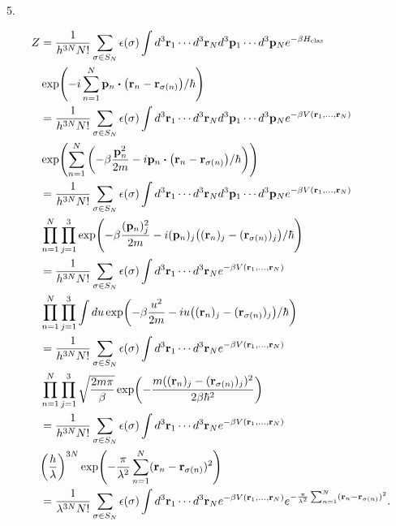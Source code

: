 \documentclass{article}
\begin{document}
5. 

\begin{align}
\begin{split}
Z&=\frac{1}{h^{3N}N!}\sum_{\sigma\in S_N}\epsilon(\sigma)\int d^3\vb{r}_1\cdots d^3\vb{r}_N d^3\vb{p}_1\cdots d^3\vb{p}_Ne^{-\beta H_{\text{clas}}}\\
&\exp(-i\sum_{n=1}^N\vb{p}_n\vdot\qty(\vb{r}_n-\vb{r}_{\sigma(n)})/\hbar)\\
&=\frac{1}{h^{3N}N!}\sum_{\sigma\in S_N}\epsilon(\sigma)\int d^3\vb{r}_1\cdots d^3\vb{r}_N d^3\vb{p}_1\cdots d^3\vb{p}_Ne^{-\beta V(\vb{r}_1,\dots,\vb{r}_N)}\\
&\exp(\sum_{n=1}^N\qty(-\beta\frac{\vb{p}_n^2}{2m}-i\vb{p}_n\vdot\qty(\vb{r}_n-\vb{r}_{\sigma(n)})/\hbar))\\
&=\frac{1}{h^{3N}N!}\sum_{\sigma\in S_N}\epsilon(\sigma)\int d^3\vb{r}_1\cdots d^3\vb{r}_N d^3\vb{p}_1\cdots d^3\vb{p}_Ne^{-\beta V(\vb{r}_1,\dots,\vb{r}_N)}\\
&\prod_{n=1}^N\prod_{j=1}^3\exp(-\beta\frac{(\vb{p}_n)_j^2}{2m}-i(\vb{p}_n)_j\qty((\vb{r}_n)_j-(\vb{r}_{\sigma(n)})_j)/\hbar)\\
&=\frac{1}{h^{3N}N!}\sum_{\sigma\in S_N}\epsilon(\sigma)\int d^3\vb{r}_1\cdots d^3\vb{r}_N e^{-\beta V(\vb{r}_1,\dots,\vb{r}_N)}\\
&\prod_{n=1}^N\prod_{j=1}^3\int du\exp(-\beta\frac{u^2}{2m}-iu\qty((\vb{r}_n)_j-(\vb{r}_{\sigma(n)})_j)/\hbar)\\
&=\frac{1}{h^{3N}N!}\sum_{\sigma\in S_N}\epsilon(\sigma)\int d^3\vb{r}_1\cdots d^3\vb{r}_N e^{-\beta V(\vb{r}_1,\dots,\vb{r}_N)}\\
&\prod_{n=1}^N\prod_{j=1}^3\sqrt{\frac{2m\pi}{\beta}}\exp(-\frac{m((\vb{r}_n)_j-(\vb{r}_{\sigma(n)})_j)^2}{2\beta\hbar^2})\\
&=\frac{1}{h^{3N}N!}\sum_{\sigma\in S_N}\epsilon(\sigma)\int d^3\vb{r}_1\cdots d^3\vb{r}_N e^{-\beta V(\vb{r}_1,\dots,\vb{r}_N)}\\
&\qty(\frac{h}{\lambda})^{3N}\exp(-\frac{\pi}{\lambda^2}\sum_{n=1}^N(\vb{r}_n-\vb{r}_{\sigma(n)})^2)\\
&=\frac{1}{\lambda^{3N}N!}\sum_{\sigma\in S_N}\epsilon(\sigma)\int d^3\vb{r}_1\cdots d^3\vb{r}_N e^{-\beta V(\vb{r}_1,\dots,\vb{r}_N)}e^{-\frac{\pi}{\lambda^2}\sum_{n=1}^N(\vb{r}_n-\vb{r}_{\sigma(n)})^2}.
\end{split}
\end{align}
\end{document}
